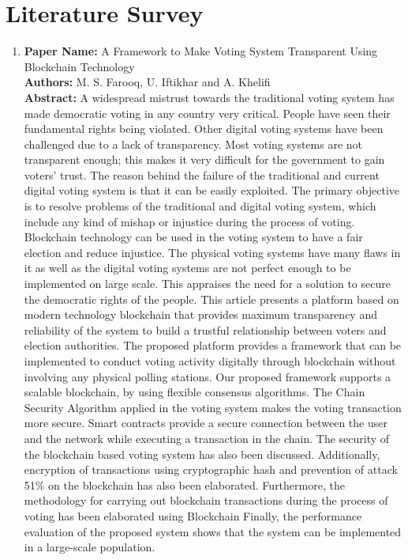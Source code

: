 \documentclass[journal,onecolumn]{IEEEtran}
\begin{document}
  \section{Literature Survey}
  \begin{enumerate}
  	\item
  	  \textbf{Paper Name:} A Framework to Make Voting System Transparent Using Blockchain Technology\\
	  \textbf{Authors:} M. S. Farooq, U. Iftikhar and A. Khelifi\\
	  \textbf{Abstract:} A widespread mistrust towards the traditional voting system has made democratic voting in any country very critical. People have seen their fundamental rights being violated. Other digital voting systems have been challenged due to a lack of transparency. Most voting systems are not transparent enough; this makes it very difficult for the government to gain voters’ trust. The reason behind the failure of the traditional and current digital voting system is that it can be easily exploited. The primary objective is to resolve problems of the traditional and digital voting system, which include any kind of mishap or injustice during the process of voting. Blockchain technology can be used in the voting system to have a fair election and reduce injustice. The physical voting systems have many flaws in it as well as the digital voting systems are not perfect enough to be implemented on large scale. This appraises the need for a solution to secure the democratic rights of the people. This article presents a platform based on modern technology blockchain that provides maximum transparency and reliability of the system to build a trustful relationship between voters and election authorities. The proposed platform provides a framework that can be implemented to conduct voting activity digitally through blockchain without involving any physical polling stations. Our proposed framework supports a scalable blockchain, by using flexible consensus algorithms. The Chain Security Algorithm applied in the voting system makes the voting transaction more secure. Smart contracts provide a secure connection between the user and the network while executing a transaction in the chain. The security of the blockchain based voting system has also been discussed. Additionally, encryption of transactions using cryptographic hash and prevention of attack 51\% on the blockchain has also been elaborated. Furthermore, the methodology for carrying out blockchain transactions during the process of voting has been elaborated using Blockchain Finally, the performance evaluation of the proposed system shows that the system can be implemented in a large-scale population.

\end{enumerate}
\end{document}
